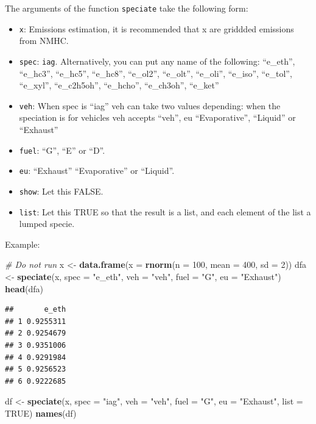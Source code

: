 \documentclass[12pt,graybox,envcountchap,sectrefs]{krantz}
\makeatletter
\newenvironment{Shaded}{\begin{snugshade}}{\end{snugshade}}
\newcommand{\KeywordTok}[1]{\textcolor[rgb]{0.13,0.29,0.53}{\textbf{#1}}}
\newcommand{\DataTypeTok}[1]{\textcolor[rgb]{0.13,0.29,0.53}{#1}}
\newcommand{\DecValTok}[1]{\textcolor[rgb]{0.00,0.00,0.81}{#1}}
\newcommand{\StringTok}[1]{\textcolor[rgb]{0.31,0.60,0.02}{#1}}
\newcommand{\CommentTok}[1]{\textcolor[rgb]{0.56,0.35,0.01}{\textit{#1}}}
\newcommand{\OtherTok}[1]{\textcolor[rgb]{0.56,0.35,0.01}{#1}}
\newcommand{\NormalTok}[1]{#1}
\providecommand{\tightlist}{%
  \setlength{\itemsep}{0pt}\setlength{\parskip}{0pt}}
\newenvironment{kframe}{%
\medskip{}
\setlength{\fboxsep}{.8em}
 \def\at@end@of@kframe{}%
 \ifinner\ifhmode%
  \def\at@end@of@kframe{\end{minipage}}%
  \begin{minipage}{\columnwidth}%
 \fi\fi%
 \def\FrameCommand##1{\hskip\@totalleftmargin \hskip-\fboxsep
 \colorbox{shadecolor}{##1}\hskip-\fboxsep
     \hskip-\linewidth \hskip-\@totalleftmargin \hskip\columnwidth}%
 \MakeFramed {\advance\hsize-\width
   \@totalleftmargin\z@ \linewidth\hsize
   \@setminipage}}%
 {\par\unskip\endMakeFramed%
 \at@end@of@kframe}
\renewenvironment{Shaded}{\begin{kframe}}{\end{kframe}}
\theoremstyle{definition}
\theoremstyle{definition}
\theoremstyle{definition}
\theoremstyle{remark}
\makeatother
\begin{document}
The arguments of the function \texttt{speciate} take the following form:

\begin{itemize}
\tightlist
\item
  \texttt{x}: Emissions estimation, it is recommended that x are
  griddded emissions from NMHC.
\item
  \texttt{spec}: \texttt{iag}. Alternatively, you can put any name of
  the following: ``e\_eth'', ``e\_hc3'', ``e\_hc5'', ``e\_hc8'',
  ``e\_ol2'', ``e\_olt'', ``e\_oli'', ``e\_iso'', ``e\_tol'',
  ``e\_xyl'', ``e\_c2h5oh'', ``e\_hcho'', ``e\_ch3oh'', ``e\_ket''
\item
  \texttt{veh}: When spec is ``iag'' veh can take two values depending:
  when the speciation is for vehicles veh accepts ``veh'', eu
  ``Evaporative'', ``Liquid'' or ``Exhaust''
\item
  \texttt{fuel}: ``G'', ``E'' or ``D''.
\item
  \texttt{eu}: ``Exhaust'' ``Evaporative'' or ``Liquid''.
\item
  \texttt{show}: Let this FALSE.
\item
  \texttt{list}: Let this TRUE so that the result is a list, and each
  element of the list a lumped specie.
\end{itemize}

Example:

\begin{Shaded}
\begin{Highlighting}[]
\CommentTok{# Do not run}
\NormalTok{x <-}\StringTok{ }\KeywordTok{data.frame}\NormalTok{(}\DataTypeTok{x =} \KeywordTok{rnorm}\NormalTok{(}\DataTypeTok{n =} \DecValTok{100}\NormalTok{, }\DataTypeTok{mean =} \DecValTok{400}\NormalTok{, }\DataTypeTok{sd =} \DecValTok{2}\NormalTok{))}
\NormalTok{dfa <-}\StringTok{ }\KeywordTok{speciate}\NormalTok{(x, }\DataTypeTok{spec =} \StringTok{"e_eth"}\NormalTok{, }\DataTypeTok{veh =} \StringTok{"veh"}\NormalTok{, }\DataTypeTok{fuel =} \StringTok{"G"}\NormalTok{, }\DataTypeTok{eu =} \StringTok{"Exhaust"}\NormalTok{)}
\KeywordTok{head}\NormalTok{(dfa)}
\end{Highlighting}
\end{Shaded}

\begin{verbatim}
##       e_eth
## 1 0.9255311
## 2 0.9254679
## 3 0.9351006
## 4 0.9291984
## 5 0.9256523
## 6 0.9222685
\end{verbatim}

\begin{Shaded}
\begin{Highlighting}[]
\NormalTok{df <-}\StringTok{ }\KeywordTok{speciate}\NormalTok{(x, }\DataTypeTok{spec =} \StringTok{"iag"}\NormalTok{, }\DataTypeTok{veh =} \StringTok{"veh"}\NormalTok{, }\DataTypeTok{fuel =} \StringTok{"G"}\NormalTok{,}
               \DataTypeTok{eu =} \StringTok{"Exhaust"}\NormalTok{, }\DataTypeTok{list =} \OtherTok{TRUE}\NormalTok{)}
\KeywordTok{names}\NormalTok{(df)}
\end{Highlighting}
\end{Shaded}
\end{document}

